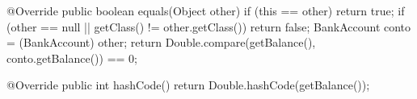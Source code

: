 \begin{unipdcode}[language=Java]
@Override
public boolean equals(Object other) {
    if (this == other) return true;
    if (other == null || getClass() != other.getClass())
        return false;
    BankAccount conto = (BankAccount) other;
    return Double.compare(getBalance(), conto.getBalance()) == 0;
}

@Override
public int hashCode() {
    return Double.hashCode(getBalance());
}
\end{unipdcode}
